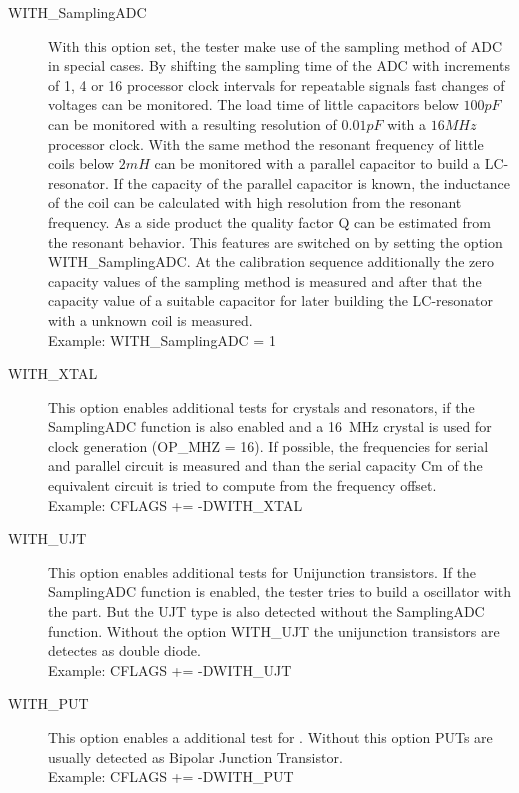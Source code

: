 \begin{description}
  \item[WITH\_SamplingADC] With this option set, the tester make use of the sampling method of ADC in special cases.
By shifting the sampling time of the ADC with increments of 1, 4 or 16 processor clock intervals for repeatable signals
fast changes of voltages can be monitored.
The load time of little capacitors below \(100pF\) can be monitored with a resulting resolution of \(0.01pF\) with a \(16MHz\) processor clock.
With the same method the resonant frequency of little coils below \(2mH\) can be monitored with a parallel capacitor to build a LC-resonator.
If the capacity of the parallel capacitor is known, the inductance of the coil can be calculated with high resolution from
the resonant frequency. As a side product the quality factor Q can be estimated from the resonant behavior.
This features are switched on by setting the option WITH\_SamplingADC.
At the calibration sequence additionally the zero capacity values of the sampling method is measured and
after that the capacity value of a suitable capacitor for later building the LC-resonator with a unknown coil is measured.\\
Example: WITH\_SamplingADC = 1

  \item[WITH\_XTAL]
This option enables additional tests for crystals and resonators, if the SamplingADC function is also enabled and
a 16~MHz crystal is used for clock generation (OP\_MHZ = 16).
If possible, the frequencies for serial and parallel circuit is measured and than the serial capacity Cm of the
equivalent circuit is tried to compute from the frequency offset.\\
Example: CFLAGS += -DWITH\_XTAL

  \item[WITH\_UJT]
This option enables additional tests for  Unijunction transistors. 
If the SamplingADC function is enabled, the tester tries to build a oscillator with the part.
But the UJT type is also detected without the SamplingADC function.
Without the option WITH\_UJT the unijunction transistors are detectes as double diode.\\
Example: CFLAGS += -DWITH\_UJT

  \item[WITH\_PUT]
This option enables a additional test for .
Without this option PUTs are usually detected as Bipolar Junction Transistor.\\
Example: CFLAGS += -DWITH\_PUT


\end{description}
